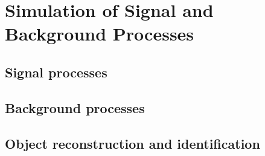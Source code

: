 \section{Simulation of Signal and Background Processes}
\label{sec:samples}

\subsection{Signal processes}

\clearpage

\subsection{Background processes}

\clearpage

\subsection{Object reconstruction and identification}

\clearpage

